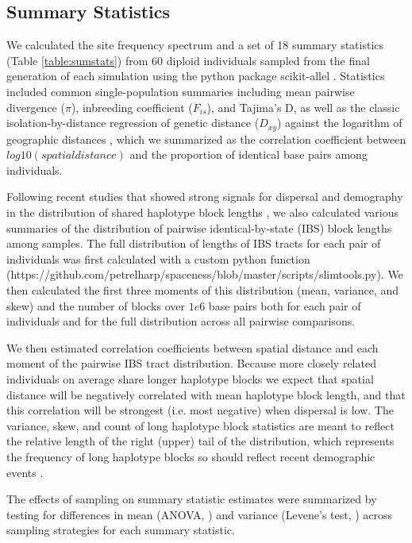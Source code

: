 \documentclass[11pt,twoside,lineno]{preprint}
\begin{document}
\subsection{Summary Statistics}
We calculated the site frequency spectrum and a set of 18 summary statistics (Table \ref{table:sumstats}) from 60 diploid individuals sampled from the final generation of each simulation using the python package scikit-allel \citep{Miles2017}. Statistics included common single-population summaries including mean pairwise divergence ($\pi$), inbreeding coefficient ($F_{is}$), and Tajima's D, as well as the classic isolation-by-distance regression of genetic distance ($D_{xy}$) against the logarithm of geographic distances \citep{Rousset1997}, which we summarized as the correlation coefficient between $log10(spatial distance)$ and the proportion of identical base pairs among individuals. 

Following recent studies that showed strong signals for dispersal and demography in the distribution of shared haplotype block lengths \citep{Ringbauer2017,Baharian2016}, we also calculated various summaries of the distribution of pairwise identical-by-state (IBS) block lengths among samples. The full distribution of lengths of IBS tracts for each pair of individuals was first calculated with a custom python function (https://github.com/petrelharp/spaceness/blob/master/scripts/slimtools.py). We then calculated the first three moments of this distribution (mean, variance, and skew) and the number of blocks over $1e6$ base pairs both for each pair of individuals and for the full distribution across all pairwise comparisons. 

We then estimated correlation coefficients between spatial distance and each moment of the pairwise IBS tract distribution. Because more closely related individuals on average share longer haplotype blocks we expect that spatial distance will be negatively correlated with mean haplotype block length, and that this correlation will be strongest (i.e. most negative) when dispersal is low. The variance, skew, and count of long haplotype block statistics are meant to reflect the relative length of the right (upper) tail of the distribution, which represents the frequency of long haplotype blocks so should reflect recent demographic events \citep{Ringbauer2017}. 

The effects of sampling on summary statistic estimates were summarized by testing for differences in mean (ANOVA, \citep{Rcore2018}) and variance (Levene's test, \citep{Fox2011}) across sampling strategies for each summary statistic. 
\end{document}
